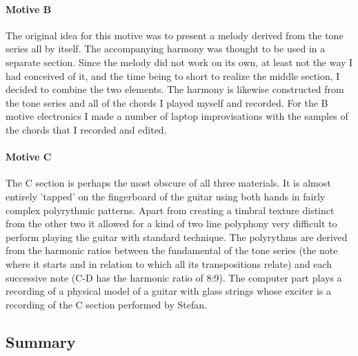 \paragraph{Motive B}
\label{sec:motive-b}

The original idea for this motive was to present a melody derived from
the tone series all by itself. The accompanying harmony was thought to
be used in a separate section. Since the melody did not work on its
own, at least not the way I had conceived of it, and the time being to
short to realize the middle section, I decided to combine the two
elements. The harmony is likewise constructed from the tone series and
all of the chords I played myself and recorded. For the B motive
electronics I made a number of laptop improvisations with the samples
of the chords that I recorded and edited.

\paragraph{Motive C}
\label{sec:motive-c}

The C section is perhaps the most obscure of all three materials. It
is almost entirely 'tapped' on the fingerboard of the guitar using
both hands in fairly complex polyrythmic patterns. Apart from creating
a timbral texture distinct from the other two it allowed for a kind of
two line polyphony very difficult to perform playing the guitar with
standard technique. The polyrythms are derived from the harmonic ratios
between the fundamental of the tone series (the note where it
starts and in relation to which all its transpositions relate) and each
successive note (C-D has the harmonic ratio of 8:9). The computer part
plays a recording of a physical model of a guitar with glass strings
whose exciter is a recording of the C section performed by Stefan.

\subsection{Summary}
\label{sec:summary}

